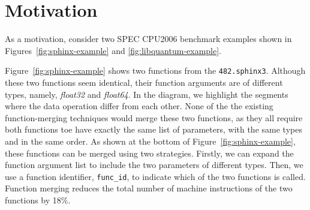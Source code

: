\section{Motivation} \label{sec:motivation}


As a motivation, consider two SPEC CPU2006 benchmark examples shown in Figures~\ref{fig:sphinx-example} and \ref{fig:libquantum-example}.


Figure~\ref{fig:sphinx-example} shows two functions from the \texttt{482.sphinx3}. Although these two functions seem identical, their
function arguments are of different types, namely, \textit{float32} and \textit{float64}. In the diagram, we highlight the segments where
the data operation differ from each other. None of the the existing function-merging techniques would merge these two functions, as they
all require both functions toe have exactly the same list of parameters, with the same types and in the same order. As shown at the bottom
of Figure~\ref{fig:sphinx-example}, these functions can be merged using two strategies. Firstly, we can expand the function argument list
to include the two parameters of different types. Then, we use a function identifier, \texttt{func\_id}, to indicate which of the two
functions is called. Function merging reduces the total number of machine instructions of the two functions by 18\%.


